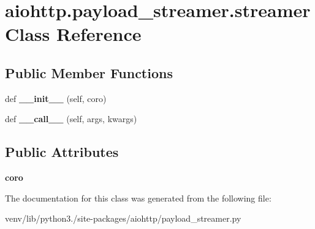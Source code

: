 \hypertarget{classaiohttp_1_1payload__streamer_1_1streamer}{}\section{aiohttp.\+payload\+\_\+streamer.\+streamer Class Reference}
\label{classaiohttp_1_1payload__streamer_1_1streamer}
\subsection*{Public Member Functions}
\begin{DoxyCompactItemize}
\item 
\mbox{\label{classaiohttp_1_1payload__streamer_1_1streamer_a637efd3867ed077af8a2e8a7f47ca8fc}} 
def {\bfseries \+\_\+\+\_\+init\+\_\+\+\_\+} (self, coro)
\item 
\mbox{\label{classaiohttp_1_1payload__streamer_1_1streamer_a092a6fc27e3953ac9f212468062e733a}} 
def {\bfseries \+\_\+\+\_\+call\+\_\+\+\_\+} (self, args, kwargs)
\end{DoxyCompactItemize}
\subsection*{Public Attributes}
\begin{DoxyCompactItemize}
\item 
\mbox{\label{classaiohttp_1_1payload__streamer_1_1streamer_a3dde70111aa00477aa1a832ea9a033cd}} 
{\bfseries coro}
\end{DoxyCompactItemize}


The documentation for this class was generated from the following file\+:\begin{DoxyCompactItemize}
\item 
venv/lib/python3./site-\/packages/aiohttp/payload\+\_\+streamer.\+py\end{DoxyCompactItemize}
